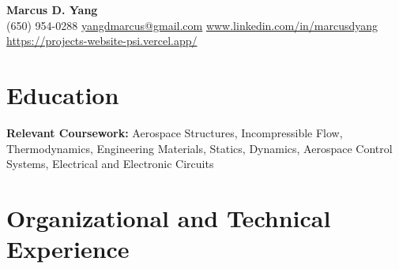 \newcommand{\entrygap}{\vspace{2pt}}



\begin{center}
  {\fontsize{17}{20}\selectfont\bfseries Marcus D. Yang}\\[2pt]
  {\footnotesize (650) 954-0288 \textbar{} \href{mailto:yangdmarcus@gmail.com}{yangdmarcus@gmail.com} \textbar{} \href{https://www.linkedin.com/in/marcusdyang}{www.linkedin.com/in/marcusdyang} \textbar{} \href{https://projects-website-psi.vercel.app/}{https://projects-website-psi.vercel.app/}}
\end{center}

\section{Education}
\textbf{Relevant Coursework:} Aerospace Structures, Incompressible Flow, Thermodynamics, Engineering Materials, Statics, Dynamics, Aerospace Control Systems, Electrical and Electronic Circuits

\section{Organizational and Technical Experience}

